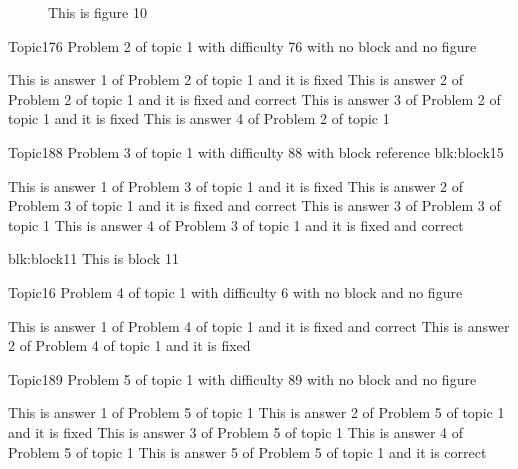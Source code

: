 \documentclass[master]{exam}
\begin{document}
\begin{figure}
	\begin{center}
		This is figure 10 
		\label{fig:figure10}
	\end{center}
\end{figure}

\begin{problem}{Topic1}{76}
	Problem 2 of topic 1 with difficulty 76 with no block and no figure
	\begin{answers}
		\answer[fixed] This is answer 1 of Problem 2 of topic 1 and it is fixed
		 This is answer 2 of Problem 2 of topic 1 and it is fixed and correct
		\answer[fixed] This is answer 3 of Problem 2 of topic 1 and it is fixed
		\answer This is answer 4 of Problem 2 of topic 1 
	\end{answers}
\end{problem}

\begin{problem}[requires=blk:block15]{Topic1}{88}
	Problem 3 of topic 1 with difficulty 88 with block reference blk:block15
	\begin{answers}
		\answer[fixed] This is answer 1 of Problem 3 of topic 1 and it is fixed
		 This is answer 2 of Problem 3 of topic 1 and it is fixed and correct
		\answer This is answer 3 of Problem 3 of topic 1 
		 This is answer 4 of Problem 3 of topic 1 and it is fixed and correct
	\end{answers}
\end{problem}



\begin{block}{blk:block11}
This is block 11
\end{block}


\begin{problem}{Topic1}{6}
	Problem 4 of topic 1 with difficulty 6 with no block and no figure
	\begin{answers}
		 This is answer 1 of Problem 4 of topic 1 and it is fixed and correct
		\answer[fixed] This is answer 2 of Problem 4 of topic 1 and it is fixed
	\end{answers}
\end{problem}

\begin{problem}{Topic1}{89}
	Problem 5 of topic 1 with difficulty 89 with no block and no figure
	\begin{answers}
		\answer This is answer 1 of Problem 5 of topic 1 
		\answer[fixed] This is answer 2 of Problem 5 of topic 1 and it is fixed
		\answer This is answer 3 of Problem 5 of topic 1 
		\answer This is answer 4 of Problem 5 of topic 1 
		\answer[correct] This is answer 5 of Problem 5 of topic 1 and it is correct
	\end{answers}
\end{problem}
\end{document}
